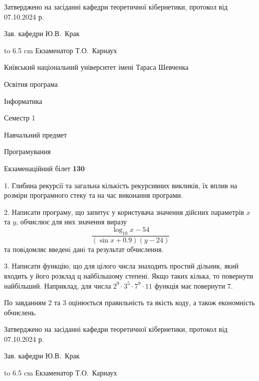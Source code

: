 \documentclass[12pt, ukrainian]{article}
\begin{document}
{\smallskip\smallskip \begin {scriptsize} Затверджено на засіданні кафедри теоретичної кібернетики, протокол   від   07.10.2024 р.\par\smallskip\smallskip\smallskip\smallskip
{\parbox {6.5 cm} {Зав. кафедри \dotfill Ю.В.~Крак}}\hspace {0.7cm} {\hbox to 6.5 cm { Екзаменатор \dotfill Т.О.~Карнаух}} \end{scriptsize}}
\newpage
{{\begin {scriptsize}\par
{ \center  Київський національний університет імені Тараса Шевченка \par}
{\parbox {5 cm}{Освітня програма \hfill}{\parbox {7 cm}{Інформатика\hfill}}\parbox {6 cm}{\hfill Семестр 1}}\par
{\parbox {5 cm} {Навчальний предмет \hfill}\parbox {7 cm}{Програмування \hfill}\parbox {6cm}{\hfill}\par}\vspace{-15pt} \end{scriptsize}}{\center Екзаменаційний білет \No \textbf { 130 }\par}}
{%
1. Глибина рекурсії та загальна кількість рекурсивних викликів, їх вплив на розміри програмного стеку та на час виконання програми.%
\par
2. Написати програму, що запитує у користувача значення дійсних параметрів $x$ та $y$, обчислює для них значення виразу 
$$\frac{\log_{10} x - 54}{(\sin x + 0.9) (y - 24)}$$ 
та повiдомляє введенi данi та результат обчислення.

\par
3. Написати функцію, що для цілого числа знаходить простий дільник, який входить у його розклад ц найбільшому степені. Якщо таких кілька, то повернути найбільший. Наприклад, для числа $2^{9}{\cdot}3^5{\cdot}7^9{\cdot}11$ функція має повернути $7$.

По завданням 2 та 3 оцінюється правильність та якість коду, а також економність обчислень.

}
{\smallskip\smallskip \begin {scriptsize} Затверджено на засіданні кафедри теоретичної кібернетики, протокол   від   07.10.2024 р.\par\smallskip\smallskip\smallskip\smallskip
{\parbox {6.5 cm} {Зав. кафедри \dotfill Ю.В.~Крак}}\hspace {0.7cm} {\hbox to 6.5 cm { Екзаменатор \dotfill Т.О.~Карнаух}} \end{scriptsize}}
\end{document}
